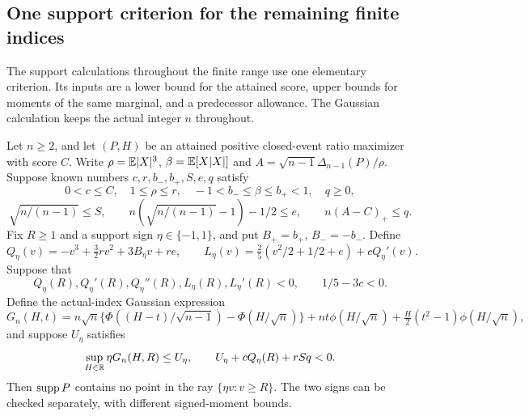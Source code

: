 \subsection{One support criterion for the remaining finite indices}
\label{j:finite:support}

The support calculations throughout the finite range use one elementary
criterion. Its inputs are a lower bound for the attained score, upper
bounds for moments of the same marginal, and a predecessor allowance.
The Gaussian calculation keeps the actual integer $n$ throughout.

\begin{lemma}
\label{j:finite:direct-gaussian-support-criterion}
Let $n\ge2$, and let $(P,H)$ be an attained positive closed-event
ratio maximizer with score $C$. Write
$\rho=\mathbb E|X|^3$, $\beta=\mathbb E[X|X|]$ and
$A=\sqrt{n-1}\Delta_{n-1}(P)/\rho$.
Suppose known numbers $c,r,b_-,b_+,S,e,q$ satisfy
\[
 0<c\le C,\quad 1\le\rho\le r,\quad
 -1<b_-\le\beta\le b_+<1,\quad q\ge0,
\]
\[
 \sqrt{n/(n-1)}\le S,\qquad
 n(\sqrt{n/(n-1)}-1)-1/2\le e,\qquad
 n(A-C)_+\le q.
\]
Fix $R\ge1$ and a support sign $\eta\in\{-1,1\}$, and put
$B_+=b_+$, $B_-=-b_-$. Define
\[
 Q_\eta(v)=-v^3+\tfrac32rv^2+3B_\eta v+re,
 \qquad
 L_\eta(v)=\tfrac25(v^2/2+1/2+e)+cQ_\eta'(v).
\]
Suppose that
\begin{equation}\label{j:finite:direct-support-ray-gates}
 Q_\eta(R),Q_\eta'(R),Q_\eta''(R),
 L_\eta(R),L_\eta'(R)<0,
 \qquad 1/5-3c<0.
\end{equation}
Define the actual-index Gaussian expression
\[
 G_n(H,t)=n\sqrt n\{\Phi((H-t)/\sqrt{n-1})-\Phi(H/\sqrt n)\}
 +nt\phi(H/\sqrt n)+\tfrac H2(t^2-1)\phi(H/\sqrt n),
\]
and suppose $U_\eta$ satisfies
\[
 \sup_{H\in\mathbb R}\eta G_n(H,R)\le U_\eta,
 \qquad U_\eta+cQ_\eta(R)+rSq<0.
\]
Then $\operatorname{supp} P$ contains no point in the ray
$\{\eta v:v\ge R\}$. The two signs can be checked separately,
with different signed-moment bounds.
\end{lemma}

